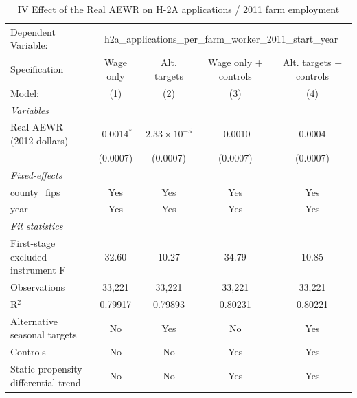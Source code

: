 
\begin{table}[htbp]
   \caption{\label{tab:iv_h2a_applications} IV Effect of the Real AEWR on H-2A applications / 2011 farm employment}
   \centering
   \begin{tabular}{lcccc}
      \tabularnewline \midrule \midrule
      Dependent Variable: & \multicolumn{4}{c}{h2a\_applications\_per\_farm\_worker\_2011\_start\_year}\\
      Specification                        & Wage only     & Alt. targets          & Wage only + controls & Alt. targets + controls \\   
      Model:                               & (1)           & (2)                   & (3)                  & (4)\\  
      \midrule
      \emph{Variables}\\
      Real AEWR (2012 dollars)             & -0.0014$^{*}$ & $2.33\times 10^{-5}$  & -0.0010              & 0.0004\\   
                                           & (0.0007)      & (0.0007)              & (0.0007)             & (0.0007)\\   
      \midrule
      \emph{Fixed-effects}\\
      county\_fips                         & Yes           & Yes                   & Yes                  & Yes\\  
      year                                 & Yes           & Yes                   & Yes                  & Yes\\  
      \midrule
      \emph{Fit statistics}\\
      First-stage excluded-instrument F    & 32.60         & 10.27                 & 34.79                & 10.85\\  
      Observations                         & 33,221        & 33,221                & 33,221               & 33,221\\  
      R$^2$                                & 0.79917       & 0.79893               & 0.80231              & 0.80221\\  
      Alternative seasonal targets         & No            & Yes                   & No                   & Yes\\  
      Controls                             & No            & No                    & Yes                  & Yes\\  
      Static propensity differential trend & No            & No                    & Yes                  & Yes\\  

\end{tabular}
\end{table}
